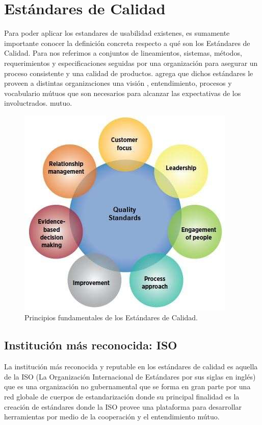 \section{Estándares de Calidad}
Para poder aplicar los estandares de usabilidad existenes, es sumamente importante conocer la
definición concreta respecto a qué son los Estándares de Calidad. Para %
nos referimos a conjuntos de lineamientos, sistemas, métodos, requerimientos y especificaciones
seguidas por una organización para asegurar un proceso consistente y una calidad de productos.
agrega que dichos estándares le proveen a distintas organizaciones una visión , entendimiento,
procesos y vocabulario mútuos que son necesarios para alcanzar las expectativas de los involuctrados.
mutuo.
\begin{figure}[t]
    \centering
    \includegraphics[scale=0.5]{../images/fig1.JPG}
    \caption{Principios fundamentales de los Estándares de Calidad.}
    \label{fig:fig1}    
\end{figure}

\subsection{Institución más reconocida: ISO}
La institución más reconocida y reputable en los estándares de calidad es aquella de la ISO
(La Organización Internacional de Estándares por sus siglas en inglés) que es una organización
no gubernamental que se forma en gran parte por una red globale de cuerpos de estandarización
donde su principal finalidad es la creación de estándares donde la ISO provee una plataforma
para desarrollar herramientas por medio de la cooperación y el entendimiento mútuo. %

